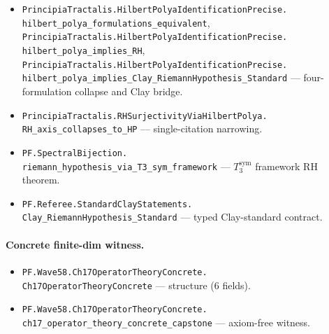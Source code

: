\documentclass[11pt,a4paper]{article}
\theoremstyle{plain}
\theoremstyle{definition}
\begin{document}
\begin{itemize}[leftmargin=*,nosep]
{  PF\_T3SymIsHilbertPolyaOperator} --- substrate $T_3^{\mathrm{sym}}$ HP form.
\item \texttt{PrincipiaTractalis.HilbertPolyaIdentificationPrecise.\\
  hilbert\_polya\_formulations\_equivalent},
  \texttt{PrincipiaTractalis.HilbertPolyaIdentificationPrecise.\\
  hilbert\_polya\_implies\_RH},
  \texttt{PrincipiaTractalis.HilbertPolyaIdentificationPrecise.\\
  hilbert\_polya\_implies\_Clay\_RiemannHypothesis\_Standard}
  --- four-formulation collapse and Clay bridge.
\item \texttt{PrincipiaTractalis.RHSurjectivityViaHilbertPolya.\\
  RH\_axis\_collapses\_to\_HP}
  --- single-citation narrowing.
\item \texttt{PF.SpectralBijection.\\
  riemann\_hypothesis\_via\_T3\_sym\_framework}
  --- $T_3^{\mathrm{sym}}$ framework RH theorem.
\item \texttt{PF.Referee.StandardClayStatements.\\
  Clay\_RiemannHypothesis\_Standard}
  --- typed Clay-standard contract.
\end{itemize}

\paragraph{Concrete finite-dim witness.}
\begin{itemize}[leftmargin=*,nosep]
\item \texttt{PF.Wave58.Ch17OperatorTheoryConcrete.\\
  Ch17OperatorTheoryConcrete} --- structure (6 fields).
\item \texttt{PF.Wave58.Ch17OperatorTheoryConcrete.\\
  ch17\_operator\_theory\_concrete\_capstone}
  --- axiom-free witness.
\end{itemize}
\end{document}
